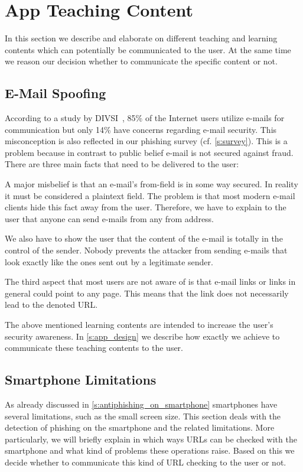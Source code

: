 \section{App Teaching Content}

In this section we describe and elaborate on different teaching and learning contents which can potentially be communicated to the user.
 At the same time we reason our decision whether to communicate the specific content or not.


\subsection{E-Mail Spoofing}
According to a study by DIVSI~\cite{divsi2012divsi}, 85\% of the Internet users utilize e-mails for communication but only 14\% have concerns regarding e-mail security.
This misconception is also reflected in our phishing survey (cf. \autoref{s:survey}).
This is a problem because in contrast to public belief e-mail is not secured against fraud. There are three main facts that need to be delivered to the user:
\begin{description}[leftmargin=0cm]
	\item[From Field:] A major misbelief is that an e-mail's from-field is in some way secured.
	In reality it must be considered a plaintext field.
	The problem is that most modern e-mail clients hide this fact away from the user.
	Therefore, we have to explain to the user that anyone can send e-mails from any from address. 
	\item[E-Mail Content:] We also have to show the user that the content of the e-mail is totally in the control of the sender.
	Nobody prevents the attacker from sending e-mails that look exactly like the ones sent out by a legitimate sender.
	\item[Links in E-Mails:] The third aspect that most users are not aware of is that e-mail links or links in general could point to any page. 
	This means that the link does not necessarily lead to the denoted URL.
\end{description}
The above mentioned learning contents are intended to increase the user's security awareness.
In \autoref{s:app_design} we describe how exactly we achieve to communicate these teaching contents to the user.

\subsection{Smartphone Limitations}
As already discussed in \autoref{s:antiphishing_on_smartphone} smartphones have several limitations, such as the small screen size. 
This section deals with the detection of phishing on the smartphone and the related limitations.
More particularly, we will briefly explain in which ways URLs can be checked with the smartphone and what kind of problems these operations raise.
Based on this we decide whether to communicate this kind of URL checking to the user or not.

